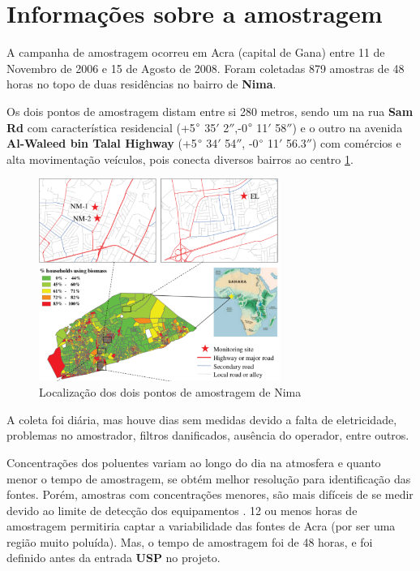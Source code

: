 \section{Informações sobre a amostragem}


A campanha de amostragem ocorreu em Acra (capital de Gana) 
entre 11 de Novembro de 2006 e 15 de Agosto de 2008. 
Foram coletadas 879 amostras de 48 horas no topo de duas residências 
no bairro de \textbf{Nima}.

Os dois pontos de amostragem distam entre si 280 metros, sendo um na rua
\textbf{Sam Rd} com característica residencial
(+5$\degree$ 35$'$ 2$''$,-0$\degree$ 11$'$ 58$''$)
e o outro na avenida \textbf{Al-Waleed bin Talal Highway} 
(+5$\degree$ 34$'$ 54$''$, -0$\degree$ 11$'$ 56.3$''$) com comércios e
alta movimentação veículos, pois conecta diversos bairros ao centro
\ref{fig:nima}. 

\begin{figure}[H]
\begin{center}
  \includegraphics[width=0.7\textwidth]{../inputs/images/zheng/nima_mapa.pdf}
  \caption{Localização dos dois pontos de amostragem de Nima \label{fig:nima}}
\end{center}
\end{figure}

A coleta foi diária, mas houve dias sem medidas devido a falta de eletricidade,
problemas no amostrador, filtros danificados, ausência do operador, entre outros. 

Concentrações dos poluentes variam ao longo do dia na atmosfera
e quanto menor o tempo de amostragem, se obtém melhor resolução 
para identificação das fontes. Porém, amostras com concentrações menores, 
são mais difíceis de se medir devido ao limite de detecção dos equipamentos
\citep{calzolai2015}. 12 ou menos horas de amostragem permitiria captar 
a variabilidade das fontes de Acra (por ser uma região muito poluída).
Mas, o tempo de amostragem foi de 48 horas, e foi definido antes da 
entrada \textbf{USP} no projeto.

